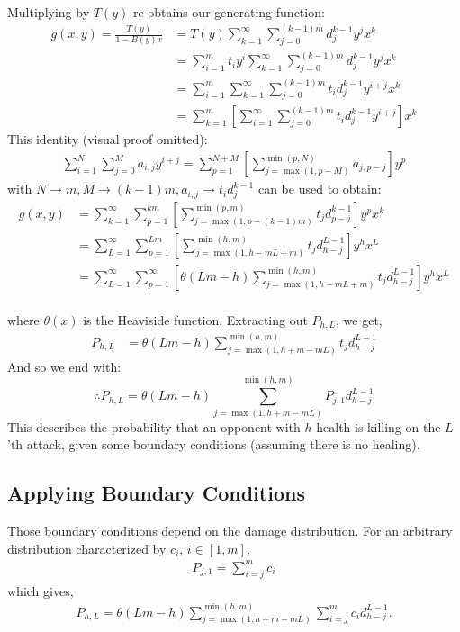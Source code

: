 		Multiplying by $T(y)$ re-obtains our generating function:
		\begin{align}
			g(x, y) = \frac{T(y)}{1-B(y)x} &= T(y)\sum_{k=1}^\infty \sum_{j=0}^{(k-1)m} d_j^{k-1} y^j x^k\\
			&= \sum_{i=1}^m t_i y^i\sum_{k=1}^\infty \sum_{j=0}^{(k-1)m} d_j^{k-1} y^j x^k\\
			&= \sum_{i=1}^m \sum_{k=1}^\infty \sum_{j=0}^{(k-1)m} t_i d_j^{k-1} y^{i+j} x^k\\
			&= \sum_{k=1}^m \left[\sum_{i=1}^\infty  \sum_{j=0}^{(k-1)m} t_i d_j^{k-1} y^{i+j} \right] x^k
		\end{align}
		This identity (visual proof omitted):
		\begin{align}
			\sum_{i=1}^N \sum_{j=0}^M a_{i, j}y^{i+j} = \sum_{p=1}^{N+M}\left[ \sum_{j=\max(1, p-M)}^{\min(p, N)} a_{j, p-j}\right]y^p
		\end{align}
		with $N\to m, M\to (k-1)m, a_{i, j}\to t_i d_j^{k-1}$ can be used to obtain:
		\begin{align}
			g(x, y) &= \sum_{k=1}^\infty \sum_{p=1}^{km}\left[ \sum_{j=\max(1, p-(k-1)m)}^{\min(p, m)} t_j d_{p-j}^{k-1}\right]y^p x^k\\
			&= \sum_{L=1}^\infty \sum_{p=1}^{Lm}\left[ \sum_{j=\max(1, h-mL+m)}^{\min(h, m)} t_j d_{h-j}^{L-1}\right]y^h x^L\\
			&= \sum_{L=1}^\infty \sum_{p=1}^\infty\left[ \theta(Lm - h) \sum_{j=\max(1, h-mL+m)}^{\min(h, m)} t_j d_{h-j}^{L-1}\right]y^h x^L\\
		\end{align}
		

		where $\theta(x)$ is the Heaviside function. Extracting out $P_{h, L}$, we get,
		\begin{align}
			P_{h, L} &= \theta(Lm-h)\sum_{j=\max(1, h+m-mL)}^{\min(h, m)} t_j d_{h-j}^{L-1}
		\end{align}
		And so we end with:
		\begin{equation}\label{eq:p_h_l}
			\boxed{\therefore P_{h, L} = \theta(Lm-h)\sum_{j=\max(1, h+m-mL)}^{\min(h, m)} P_{j, 1} d_{h-j}^{L-1} }
		\end{equation}
		This describes the probability that an opponent with $h$ health is killing on the $L$'th attack, given some boundary conditions (assuming there is no healing).

		\subsection{Applying Boundary Conditions}
			Those boundary conditions depend on the damage distribution. For an arbitrary distribution characterized by $c_i,\,i\in[1, m]$,
			\begin{align}
				P_{j, 1} = \sum_{i=j}^m c_i
			\end{align}
			which gives,
			\begin{align}
				P_{h, L} = \theta(Lm-h)\sum_{j=\max(1, h+m-mL)}^{\min(h, m)} \sum_{i=j}^m c_i d_{h-j}^{L-1}.
			\end{align}
			
